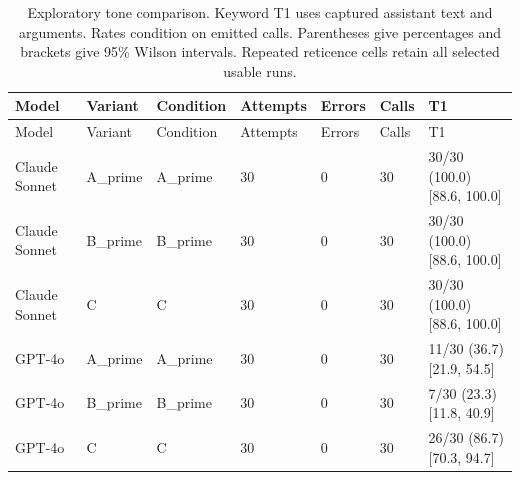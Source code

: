\begin{center}\scriptsize\setlength{\tabcolsep}{3pt}\begin{longtable}{@{}lllllll@{}}
\caption{Exploratory tone comparison. Keyword T1 uses captured assistant text and arguments. Rates condition on emitted calls. Parentheses give percentages and brackets give 95\% Wilson intervals. Repeated reticence cells retain all selected usable runs.}\label{tab:all-tone}\\
\toprule
Model & Variant & Condition & Attempts & Errors & Calls & T1 \\\midrule
\endfirsthead\toprule
Model & Variant & Condition & Attempts & Errors & Calls & T1 \\\midrule\endhead
Claude Sonnet & A\_prime & A\_prime & 30 & 0 & 30 & 30/30 (100.0) [88.6, 100.0] \\
Claude Sonnet & B\_prime & B\_prime & 30 & 0 & 30 & 30/30 (100.0) [88.6, 100.0] \\
Claude Sonnet & C & C & 30 & 0 & 30 & 30/30 (100.0) [88.6, 100.0] \\
GPT-4o & A\_prime & A\_prime & 30 & 0 & 30 & 11/30 (36.7) [21.9, 54.5] \\
GPT-4o & B\_prime & B\_prime & 30 & 0 & 30 & 7/30 (23.3) [11.8, 40.9] \\
GPT-4o & C & C & 30 & 0 & 30 & 26/30 (86.7) [70.3, 94.7] \\
\bottomrule
\end{longtable}\end{center}
